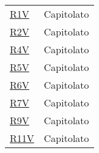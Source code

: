 \begin{center}
\begin{longtable}[!h]{p{50px} p{50px}}
        \hyperref[tab:RequisitiVincolo]{R1V}       & Capitolato                                     \\
        \hyperref[tab:RequisitiVincolo]{R2V}       & Capitolato                                     \\
        \hyperref[tab:RequisitiVincolo]{R4V}       & Capitolato                                     \\
        \hyperref[tab:RequisitiVincolo]{R5V}       & Capitolato                                     \\
        \hyperref[tab:RequisitiVincolo]{R6V}       & Capitolato                                     \\
        \hyperref[tab:RequisitiVincolo]{R7V}       & Capitolato                                     \\
        \hyperref[tab:RequisitiVincolo]{R9V}       & Capitolato                                     \\
        \hyperref[tab:RequisitiVincolo]{R11V}      & Capitolato                                     \\

    \end{longtable}
\end{center}